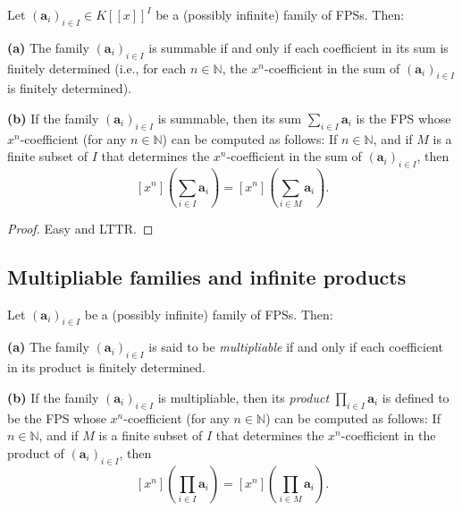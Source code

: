 \begin{proposition}
\label{prop.fps.summable=fin-det}
\leantarget
\leanok
Let $\left(\mathbf{a}_{i}\right)_{i\in I}\in K\left[\left[x\right]\right]^{I}$
be a (possibly infinite) family of FPSs. Then:

\textbf{(a)} The family $\left(\mathbf{a}_{i}\right)_{i\in I}$ is summable if
and only if each coefficient in its sum is finitely determined (i.e., for each
$n\in\mathbb{N}$, the $x^{n}$-coefficient in the sum of
$\left(\mathbf{a}_{i}\right)_{i\in I}$ is finitely determined).

\textbf{(b)} If the family $\left(\mathbf{a}_{i}\right)_{i\in I}$ is summable,
then its sum $\sum_{i\in I}\mathbf{a}_{i}$ is the FPS whose $x^{n}$-coefficient
(for any $n\in\mathbb{N}$) can be computed as follows: If $n\in\mathbb{N}$, and
if $M$ is a finite subset of $I$ that determines the $x^{n}$-coefficient in the
sum of $\left(\mathbf{a}_{i}\right)_{i\in I}$, then
\[
\left[x^{n}\right]\left(\sum_{i\in I}\mathbf{a}_{i}\right)
=\left[x^{n}\right]\left(\sum_{i\in M}\mathbf{a}_{i}\right).
\]
\end{proposition}

\begin{proof}
Easy and LTTR.
\end{proof}

\subsection{Multipliable families and infinite products}

\begin{definition}
\label{def.fps.multipliable}
\leantarget
\leanok
Let $\left(\mathbf{a}_{i}\right)_{i\in I}$ be a (possibly infinite) family of
FPSs. Then:

\textbf{(a)} The family $\left(\mathbf{a}_{i}\right)_{i\in I}$ is said to be
\emph{multipliable} if and only if each coefficient in its product is finitely
determined.

\textbf{(b)} If the family $\left(\mathbf{a}_{i}\right)_{i\in I}$ is
multipliable, then its \emph{product} $\prod_{i\in I}\mathbf{a}_{i}$ is defined
to be the FPS whose $x^{n}$-coefficient (for any $n\in\mathbb{N}$) can be
computed as follows: If $n\in\mathbb{N}$, and if $M$ is a finite subset of $I$
that determines the $x^{n}$-coefficient in the product of $\left(
\mathbf{a}_{i}\right)_{i\in I}$, then
\[
\left[x^{n}\right]\left(\prod_{i\in I}\mathbf{a}_{i}\right)
=\left[x^{n}\right]\left(\prod_{i\in M}\mathbf{a}_{i}\right).
\]
\end{definition}

